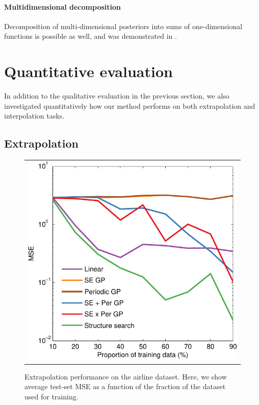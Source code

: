 \documentclass[twoside]{article}
\begin{document}
\paragraph{Multidimensional decomposition}  Decomposition of multi-dimensional posteriors into sums of one-dimensional functions is possible as well, and was demonstrated in \cite{duvenaud2011additive11}.  

\section{Quantitative evaluation}

In addition to the qualitative evaluation in the previous section, we also investigated quantitatively how our method performs on both extrapolation and interpolation tasks.

\subsection{Extrapolation}

\begin{figure}[h!]
\centering
\begin{tabular}{c}
\hspace{-0.5cm} \includegraphics[width=0.95\columnwidth]{../figures/extrapolation_curves/01-airline-s-ex-curve_hint.pdf}
\end{tabular}
\caption{Extrapolation performance on the airline dataset.  Here, we show average test-set MSE as a function of the fraction of the dataset used for training. 
}
\label{fig:extrapolation}
\end{figure}
\end{document}
